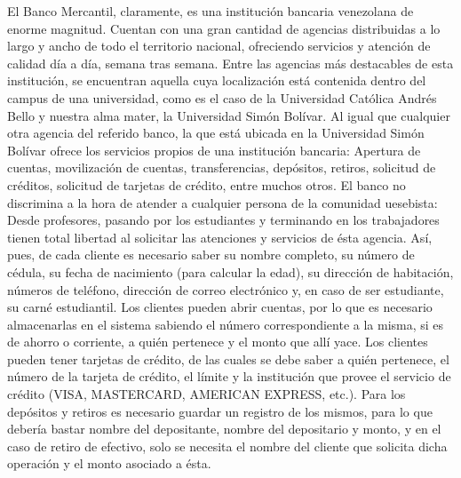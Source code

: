 \documentclass[12pt,a4paper,spanish]{article}
\begin{document}
\newline
\indent El Banco Mercantil, claramente, es una instituci\'on bancaria venezolana 
de enorme magnitud. Cuentan con una gran cantidad de agencias distribuidas a lo 
largo y ancho de todo el territorio nacional, ofreciendo servicios y atenci\'on de 
calidad d\'ia a d\'ia, semana tras semana. Entre las agencias m\'as destacables de 
esta instituci\'on, se encuentran aquella cuya localizaci\'on est\'a contenida dentro 
del campus de una universidad, como es el caso de la Universidad Cat\'olica Andr\'es 
Bello y nuestra alma mater, la Universidad Sim\'on Bol\'ivar. 
\newline
\newline
\indent Al igual que cualquier otra agencia del referido banco, la que est\'a ubicada en la Universidad Sim\'on Bol\'ivar ofrece los servicios propios de una instituci\'on bancaria: Apertura de cuentas, movilizaci\'on de cuentas, transferencias, dep\'ositos, retiros, solicitud de cr\'editos, solicitud de tarjetas de cr\'edito, entre muchos otros. 
\newline
\newline
\indent El banco no discrimina a la hora de atender a cualquier persona de la comunidad uesebista: Desde profesores, pasando por los estudiantes y terminando en los trabajadores tienen total libertad al solicitar las atenciones y servicios de \'esta agencia. As\'i, pues, de cada cliente es necesario saber su nombre completo, su n\'umero de c\'edula, su fecha de nacimiento (para calcular la edad), su direcci\'on de habitaci\'on, n\'umeros de tel\'efono, direcci\'on de correo electr\'onico y, en caso de ser estudiante, su carn\'e estudiantil.
\newline
\newline
\indent Los clientes pueden abrir cuentas, por lo que es necesario almacenarlas en el sistema sabiendo el n\'umero correspondiente a la misma, si es de ahorro o corriente, a qui\'en pertenece y el monto que all\'i yace. Los clientes pueden tener tarjetas de cr\'edito, de las cuales se debe saber a qui\'en pertenece, el n\'umero de la tarjeta de cr\'edito, el l\'imite y la instituci\'on que provee el servicio de cr\'edito (VISA, MASTERCARD, AMERICAN EXPRESS, etc.). Para los dep\'ositos y retiros es necesario guardar un registro de los mismos, para lo que deber\'ia bastar nombre del depositante, nombre del depositario y monto, y en el caso de retiro de efectivo, solo se necesita el nombre del cliente que solicita dicha operaci\'on y el monto asociado a \'esta.
\newline
\end{document}
